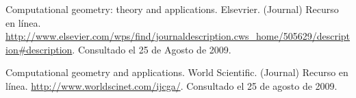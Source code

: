 \documentclass[final, 12pt letterpaper]{article}
\begin{document}
\begin{thebibliography}{20}
Computational geometry: theory and applications. Elsevrier. (Journal) Recurso en línea.
\newblock \url{http://www.elsevier.com/wps/find/journaldescription.cws_home/505629/description#description}. Consultado el 25 de Agosto de 2009.

Computational geometry and applications. World Scientific. (Journal) Recurso en línea. 
\newblock \url{http://www.worldscinet.com/ijcga/}. Consultado el 25 de agosto de 2009.

\end{thebibliography}
\end{document}
